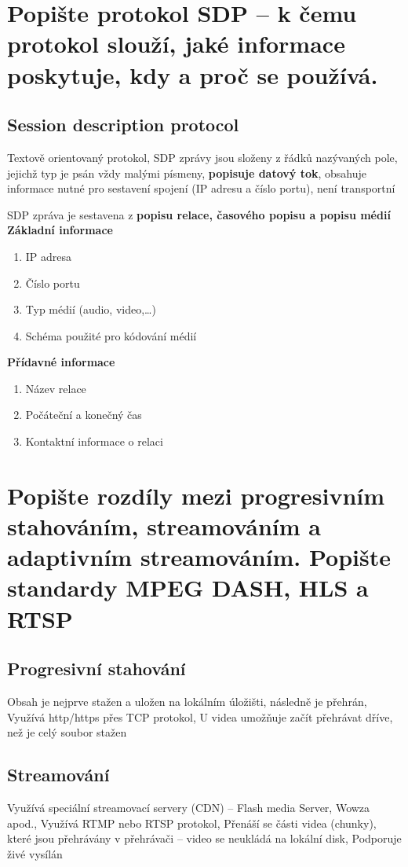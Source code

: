 \newpage
\section{Popište protokol SDP – k čemu protokol slouží, jaké informace poskytuje, kdy a proč se používá.}

\subsection{Session description protocol}
Textově orientovaný protokol, SDP zprávy jsou složeny z řádků nazývaných pole, jejichž typ je psán vždy malými písmeny, \textbf{popisuje datový tok}, obsahuje informace nutné pro sestavení spojení (IP adresu a číslo portu), není transportní

SDP zpráva je sestavena z \textbf{popisu relace, časového popisu a popisu médií}
\newline
\textbf{Základní informace}
\begin{enumerate}
    \item IP adresa
    \item Číslo portu
    \item Typ médií (audio, video,…)
    \item Schéma použité pro kódování médií
\end{enumerate}
\textbf{Přídavné informace}
\begin{enumerate}
    \item Název relace
    \item Počáteční a konečný čas
    \item Kontaktní informace o relaci
\end{enumerate}

\newpage
\section{Popište rozdíly mezi progresivním stahováním, streamováním a adaptivním streamováním. Popište standardy MPEG DASH, HLS a RTSP}

\subsection{Progresivní stahování}
Obsah je nejprve stažen a uložen na lokálním úložišti, následně je přehrán, Využívá http/https přes TCP protokol, U videa umožňuje začít přehrávat dříve, než je celý soubor stažen

\subsection{Streamování}
Využívá speciální streamovací servery (CDN) – Flash media Server, Wowza apod., Využívá RTMP nebo RTSP protokol, Přenáší se části videa (chunky), které jsou přehrávány v přehrávači – video se neukládá
na lokální disk, Podporuje živé vysílán

